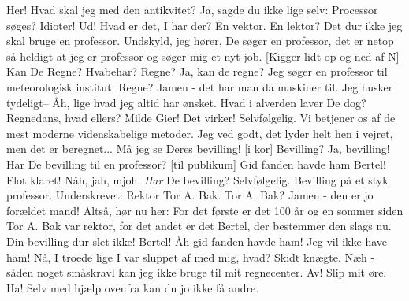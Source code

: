 \documentclass[a4paper,11pt]{article}
\begin{document}
\begin{sketch}
 Her!
 Hvad skal jeg med den antikvitet?
 Ja, sagde du ikke lige selv: Processor søges?
 Idioter!  Ud!
 Hvad er det, I har der?
 En vektor.
 En lektor?  Det dur ikke jeg skal bruge en professor.
 Undskyld, jeg hører, De søger en professor, det er netop så heldigt at jeg er professor og søger mig et nyt job.
[Kigger lidt op og ned af N] Kan De Regne?
 Hvabehar?  Regne?
 Ja, kan de regne?  Jeg søger en professor til meteorologisk institut.
 Regne? Jamen - det har man da maskiner til.  Jeg husker tydeligt--
 Åh, lige hvad jeg altid har ønsket.
 Hvad i alverden laver De dog?
 Regnedans, hvad ellers?
 Milde Gier!  Det virker!
 Selvfølgelig.  Vi betjener os af de mest moderne videnskabelige metoder.  Jeg ved godt, det lyder helt hen i vejret, men det er beregnet...
 Må jeg se Deres bevilling!
[i kor] Bevilling?
 Ja, bevilling!  Har De bevilling til en professor?
[til publikum] Gid fanden havde ham Bertel!
 Flot klaret!
 Nåh, jah, mjoh.  \emph{Har} De bevilling?
 Selvfølgelig.    Bevilling på et styk professor.  Underskrevet: Rektor Tor A. Bak.
 Tor A. Bak?  Jamen - den er jo forældet mand!  Altså, hør nu her:  For det første er det 100 år og en sommer siden Tor A. Bak var rektor, for det andet er det Bertel, der bestemmer den slags nu.  Din bevilling dur slet ikke!
 Bertel!  Åh gid fanden havde ham!
 Jeg vil ikke have ham!
 Nå, I troede lige I var sluppet af med mig, hvad?  Skidt knægte.  Næh - såden noget småskravl kan jeg ikke bruge til mit regnecenter.
 Av!  Slip mit øre.
 Ha!  Selv med hjælp ovenfra kan du jo ikke få andre.

\end{sketch}
\end{document}
